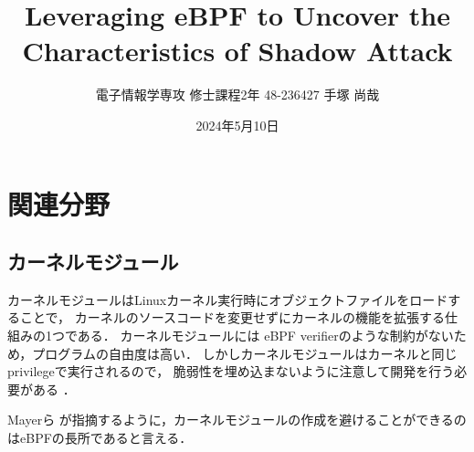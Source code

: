 \documentclass[platex,a4j,10pt,twoside,twocolumn,dvipdfmx]{jsarticle}
\title{Leveraging eBPF to Uncover the Characteristics of Shadow Attack}
\author{電子情報学専攻 修士課程2年 48-236427 手塚 尚哉}
\date{2024年5月10日}
\begin{document}






\section{関連分野}
\subsection{カーネルモジュール}
カーネルモジュールはLinuxカーネル実行時にオブジェクトファイルをロードすることで，
カーネルのソースコードを変更せずにカーネルの機能を拡張する仕組みの1つである．
カーネルモジュールには eBPF verifierのような制約がないため，プログラムの自由度は高い．
しかしカーネルモジュールはカーネルと同じprivilegeで実行されるので，
脆弱性を埋め込まないように注意して開発を行う必要がある \cite{chen2011linux}．

Mayerら \cite{mayer2021performance}が指摘するように，カーネルモジュールの作成を避けることができるのはeBPFの長所であると言える．
\end{document}
